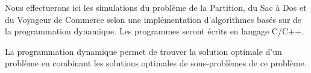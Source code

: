 Nous effectuerons ici les simulations du problème de la Partition, du Sac
à Dos et du Voyageur de Commerce selon une implémentation
d'algorithmes basés sur de la programmation dynamique. Les programmes
seront écrits en langage C/C++.

La programmation dynamique permet de trouver la solution optimale d'un
problème en combinant les solutions optimales de sous-problèmes de ce
problème.
